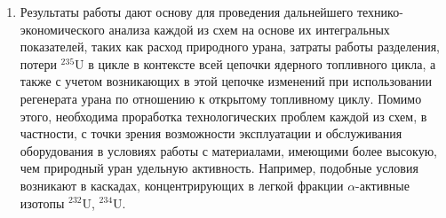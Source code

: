 \begin{enumerate}
\item Результаты работы дают основу для проведения дальнейшего технико-экономического анализа каждой из схем на основе их интегральных показателей, таких как расход природного урана, затраты работы разделения, потери $^{235}$U в цикле в контексте всей цепочки ядерного топливного цикла, а также с учетом возникающих в этой цепочке изменений при использовании регенерата урана по отношению к открытому топливному циклу. Помимо этого, необходима проработка технологических проблем каждой из схем, в частности, с точки зрения возможности эксплуатации и обслуживания оборудования в условиях работы с материалами, имеющими более высокую, чем природный уран удельную активность. Например, подобные условия возникают в каскадах, концентрирующих в легкой фракции $\alpha$-активные изотопы $^{232}$U, $^{234}$U.
\end{enumerate}
